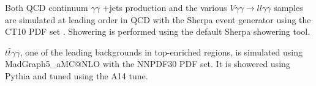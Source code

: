 Both QCD continuum $\gamma\gamma$ +jets production and the various $V\gamma\gamma \rightarrow ll\gamma\gamma$ samples are simulated at leading order in QCD with the Sherpa event generator using the CT10 PDF set \cite{CT10}. Showering is performed using the default Sherpa showering tool. 

\begin{sloppypar}
$t\bar{t}\gamma\gamma$, one of the leading backgrounds in top-enriched regions, is simulated using {MadGraph5\_aMC@NLO} with the NNPDF30 PDF set. It is showered using Pythia and tuned using the A14 tune.
\end{sloppypar}


\begin{table}[h!]
  \centering
\caption{Summary of nominal background samples}
\label{tab:bckg_samples}
\end{table}  

